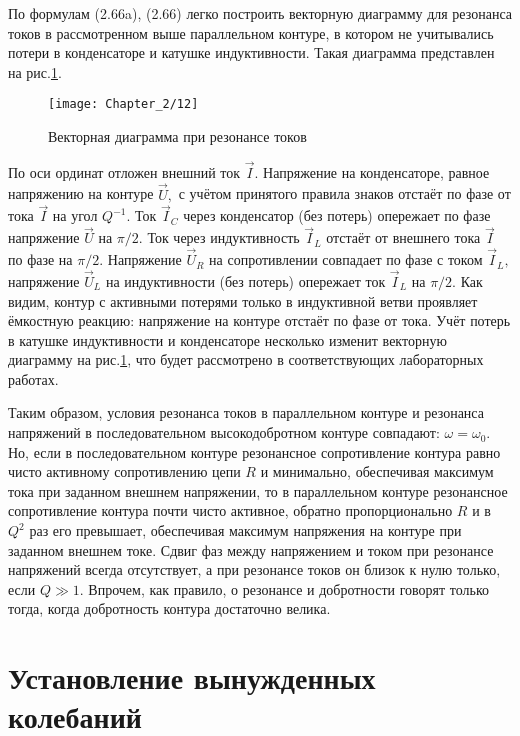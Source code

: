 {По формулам (2.66a), (2.66) легко построить векторную диаграмму для резонанса токов в рассмотренном выше параллельном контуре, в котором не учитывались потери в конденсаторе и катушке индуктивности. Такая диаграмма представлен на рис.\ref{fig8}.

\begin{figure}[h!]
	\centering\texttt{[image: Chapter\_2/12]}
	\caption{Векторная диаграмма при резонансе токов}
	\label{fig8}
\end{figure}

По оси ординат отложен внешний ток $\vec I.$ Напряжение на конденсаторе, равное напряжению на контуре $\vec U,$ с учётом принятого правила знаков отстаёт по фазе от тока $\vec I$ на угол $Q^{-1}.$ Ток $\vec I_C$ через конденсатор (без потерь) опережает по фазе напряжение $\vec U$ на $\pi/2.$ Ток через индуктивность $\vec I_L$ отстаёт от внешнего тока $\vec I$ по фазе на $\pi/2.$  Напряжение $\vec U_R$ на сопротивлении совпадает по фазе с током $\vec I_L,$ напряжение $\vec U_L$ на индуктивности (без потерь) опережает ток $\vec I_L$ на $\pi/2.$ Как видим, контур с активными потерями только в индуктивной ветви проявляет ёмкостную реакцию: напряжение на контуре отстаёт по фазе от тока. Учёт потерь в катушке индуктивности и конденсаторе несколько изменит векторную диаграмму на рис.\ref{fig8}, что будет рассмотрено в соответствующих лабораторных работах.

Таким образом, условия резонанса токов в параллельном контуре и резонанса напряжений в последовательном высокодобротном контуре совпадают: $\omega=\omega_0.$ Но, если в последовательном контуре резонансное сопротивление контура равно чисто активному сопротивлению цепи $R$ и минимально, обеспечивая максимум тока при заданном внешнем напряжении, то в параллельном контуре резонансное сопротивление контура почти чисто активное, обратно пропорционально $R$ и в $Q^2$ раз его превышает, обеспечивая максимум напряжения на контуре при заданном внешнем токе. Сдвиг фаз между напряжением и током при резонансе напряжений всегда отсутствует, а при резонансе токов он близок к нулю только, если $Q\gg1.$ Впрочем, как правило, о резонансе и добротности говорят только тогда, когда добротность контура достаточно велика.

\section{Установление вынужденных колебаний}

}
